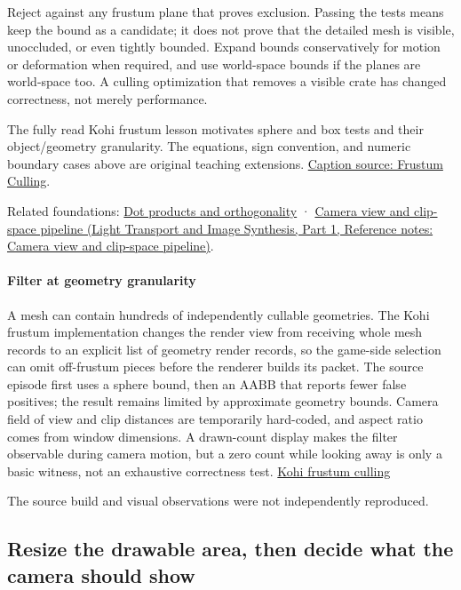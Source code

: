Reject against any frustum plane that proves exclusion. Passing the tests means keep the bound as a candidate; it does not prove that the detailed mesh is visible, unoccluded, or even tightly bounded. Expand bounds conservatively for motion or deformation when required, and use world-space bounds if the planes are world-space too. A culling optimization that removes a visible crate has changed correctness, not merely performance.

The fully read Kohi frustum lesson motivates sphere and box tests and their object/geometry granularity. The equations, sign convention, and numeric boundary cases above are original teaching extensions. \href{https://www.youtube.com/watch?v=vJrfcI_bMTA}{Caption source: Frustum Culling}.

Related foundations: \hyperref[appendix-8bc4e8fc547c]{Dot products and orthogonality} · \href{../04-Light-Transport-and-Image-Synthesis-P01/main.pdf\#nameddest=appendix-1c07d64f5e70}{Camera view and clip-space pipeline (Light Transport and Image Synthesis, Part 1, Reference notes: Camera view and clip-space pipeline)}.

\paragraph{Filter at geometry granularity}\label{06-engine-ii-ch026-filter-at-geometry-granularity}

\hypertarget{06-engine-ii-ch026-filter-at-geometry-granularity}{}

A mesh can contain hundreds of independently cullable geometries. The Kohi frustum implementation changes the render view from receiving whole mesh records to an explicit list of geometry render records, so the game-side selection can omit off-frustum pieces before the renderer builds its packet. The source episode first uses a sphere bound, then an AABB that reports fewer false positives; the result remains limited by approximate geometry bounds. Camera field of view and clip distances are temporarily hard-coded, and aspect ratio comes from window dimensions. A drawn-count display makes the filter observable during camera motion, but a zero count while looking away is only a basic witness, not an exhaustive correctness test. \href{https://www.youtube.com/watch?v=vJrfcI_bMTA}{Kohi frustum culling}

The source build and visual observations were not independently reproduced.

\subsection{Resize the drawable area, then decide what the camera should show}\label{06-engine-ii-ch026-resize-the-drawable-area-then-decide-what-the-camera-should-show}

